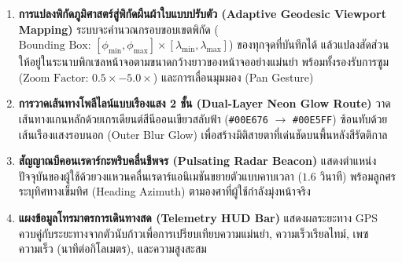 \begin{enumerate}
    \item \textbf{การแปลงพิกัดภูมิศาสตร์สู่พิกัดผืนผ้าใบแบบปรับตัว (Adaptive Geodesic Viewport Mapping)} ระบบจะคำนวณกรอบขอบเขตพิกัด ($\text{Bounding Box: } [\phi_{\min}, \phi_{\max}] \times [\lambda_{\min}, \lambda_{\max}]$) ของทุกจุดที่บันทึกได้ แล้วแปลงสัดส่วนให้อยู่ในระนาบพิกเซลหน้าจอตามขนาดกว้างยาวของหน้าจออย่างแม่นยำ พร้อมทั้งรองรับการซูม ($\text{Zoom Factor: } 0.5\times - 5.0\times$) และการเลื่อนมุมมอง (Pan Gesture)
    \item \textbf{การวาดเส้นทางโพลีไลน์แบบเรืองแสง 2 ชั้น (Dual-Layer Neon Glow Route)} วาดเส้นทางแกนหลักด้วยเกรเดียนต์สีนีออนเขียวสลับฟ้า (\texttt{\#00E676} $\to$ \texttt{\#00E5FF}) ซ้อนทับด้วยเส้นเรืองแสงรอบนอก (Outer Blur Glow) เพื่อสร้างมิติสายตาที่เด่นชัดบนพื้นหลังสีรัตติกาล
    \item \textbf{สัญญาณบีคอนเรดาร์กะพริบคลื่นชีพจร (Pulsating Radar Beacon)} แสดงตำแหน่งปัจจุบันของผู้ใช้ด้วยวงแหวนคลื่นเรดาร์แอนิเมชันขยายตัวแบบคาบเวลา ($1.6\text{ วินาที}$) พร้อมลูกศรระบุทิศทางเข็มทิศ (Heading Azimuth) ตามองศาที่ผู้ใช้กำลังมุ่งหน้าจริง
    \item \textbf{แผงข้อมูลโทรมาตรการเดินทางสด (Telemetry HUD Bar)} แสดงผลระยะทาง GPS ควบคู่กับระยะทางจากตัวนับก้าวเพื่อการเปรียบเทียบความแม่นยำ, ความเร็วเรียลไทม์, เพซความเร็ว (นาทีต่อกิโลเมตร), และความสูงสะสม
\end{enumerate}

